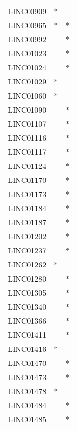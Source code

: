 \begin{longtable}{lcc}
LINC00909       &              * &            \\
LINC00965       &              * &          * \\
LINC00992       &                &          * \\
LINC01023       &                &          * \\
LINC01024       &                &          * \\
LINC01029       &              * &            \\
LINC01060       &              * &            \\
LINC01090       &                &          * \\
LINC01107       &                &          * \\
LINC01116       &                &          * \\
LINC01117       &                &          * \\
LINC01124       &                &          * \\
LINC01170       &                &          * \\
LINC01173       &                &          * \\
LINC01184       &                &          * \\
LINC01187       &                &          * \\
LINC01202       &                &          * \\
LINC01237       &                &          * \\
LINC01262       &              * &            \\
LINC01280       &                &          * \\
LINC01305       &                &          * \\
LINC01340       &                &          * \\
LINC01366       &                &          * \\
LINC01411       &                &          * \\
LINC01416       &              * &            \\
LINC01470       &                &          * \\
LINC01473       &                &          * \\
LINC01478       &              * &            \\
LINC01484       &                &          * \\
LINC01485       &                &          * \\

\end{longtable}
